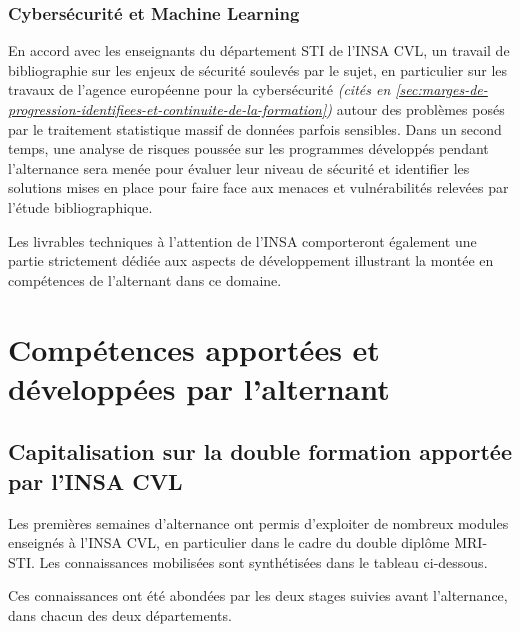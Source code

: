 \subsubsection{Cybersécurité et Machine Learning}\label{subsec:cybersecurite-et-machine-learning}

En accord avec les enseignants du département \gls{STI} de l'INSA CVL, un travail de bibliographie sur les enjeux de sécurité soulevés par le sujet, en particulier sur les travaux de l'agence européenne pour la cybersécurité \textit{(cités en \ref{sec:marges-de-progression-identifiees-et-continuite-de-la-formation})} autour des problèmes posés par le traitement statistique massif de données parfois sensibles.
Dans un second temps, une analyse de risques poussée sur les programmes développés pendant l'alternance sera menée pour évaluer leur niveau de sécurité et identifier les solutions mises en place pour faire face aux menaces et vulnérabilités relevées par l'étude bibliographique.

Les livrables techniques à l'attention de l'INSA comporteront également une partie strictement dédiée aux aspects de développement illustrant la montée en compétences de l'alternant dans ce domaine.

\section{Compétences apportées et développées par l'alternant}\label{ch:competences-apportees-et-developpees-par-l'alternant}


\subsection{Capitalisation sur la double formation apportée par l'INSA CVL}\label{sec:capitalisation-sur-la-double-formation-apportee-par-l'insa-cvl}

Les premières semaines d'alternance ont permis d'exploiter de nombreux modules enseignés à l'INSA CVL, en particulier dans le cadre du double diplôme \gls{MRI}-\gls{STI}.
Les connaissances mobilisées sont synthétisées dans le tableau ci-dessous.

Ces connaissances ont été abondées par les deux stages suivies avant l'alternance, dans chacun des deux départements.

